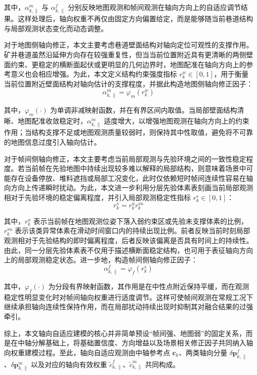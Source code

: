其中，$\alpha_{k,\parallel}^{m}$ 与 $\alpha_{k,\parallel}^{f}$ 分别反映地图观测和帧间观测在轴向方向上的自适应调节结果。这样处理后，轴向权重不再仅由固定方向偏置给定，而是能够随当前巷道结构与局部观测状态变化而动态调整。

对于地图侧轴向修正，本文主要考虑巷道壁面结构对轴向定位可观性的支撑作用。矿井巷道虽然沿延伸方向存在较强重复性，但当当前位置附近具有更清晰的两侧壁面约束、更稳定的横断面起伏或更明显的几何边界时，地图配准在轴向方向上的参考意义也会相应增强。为此，本文定义结构约束强度指标 $r_{k}^{w}\in[0,1]$，用于衡量当前位置附近壁面结构对轴向估计的支撑程度，并据此构造地图侧轴向修正因子：
\begin{equation}
\alpha_{k,\parallel}^{m}
=
\varphi_{m}\!\left(r_{k}^{w}\right)
\end{equation}

其中，$\varphi_{m}(\cdot)$ 为单调非减映射函数，并在有界区间内取值。当局部壁面结构清晰、地图配准收敛稳定时，$\alpha_{k,\parallel}^{m}$ 适度增大，以增强地图观测在轴向方向上的约束作用；当结构支撑不足或地图观测质量较弱时，则保持其中性取值，避免将不可靠的地图信息过度引入轴向估计。

对于帧间侧轴向修正，本文主要考虑当前局部观测与先验环境之间的一致性稳定程度。若当前帧在先验地图中持续出现较多难以解释的局部结构，则意味着场景中可能存在设备停放、堆料遮挡或局部工况变化，此时仅依赖短时帧间连续性容易在轴向方向上传递瞬时扰动。为此，本文进一步利用分层先验体素表刻画当前局部观测相对于先验环境的稳定偏离程度，并引入局部观测稳定性指标 $r_{k}^{s}\in[0,1]$：
\begin{equation}
r_{k}^{s}
=
r_{k}^{u}r_{k}^{su}
\end{equation}

其中，$r_{k}^{u}$ 表示当前帧在地图观测位姿下落入弱约束区或先验未支撑体素的比例，$r_{k}^{su}$ 表示该类异常体素在滑动时间窗口内的持续出现比例。前者反映当前时刻局部观测相对于先验结构的即时偏离程度，后者反映该偏离是否具有时间上的持续性。由此，同一分层先验体素表不仅用于描述横断面稳定结构，也可用于表征轴向方向上的局部观测稳定状态。进一步地，构造帧间侧轴向修正因子：
\begin{equation}
\alpha_{k,\parallel}^{f}
=
\varphi_{f}\!\left(r_{k}^{s}\right)
\end{equation}

其中，$\varphi_{f}(\cdot)$ 为分段有界映射函数，其作用是在中性点附近保持平缓，而在观测稳定性明显变化时对帧间轴向权重进行适度调节。这样可使帧间观测在常规工况下继续承担轴向连续性保持作用，而在局部扰动持续出现时抑制其对融合结果的过强牵引。

综上，本文轴向自适应建模的核心并非简单预设“帧间强、地图弱”的固定关系，而是在中轴分解基础上，将基础置信度、方向增益以及场景相关修正因子共同纳入轴向权重建模过程。至此，轴向自适应观测由中轴参考点 $\mathbf{c}_{k}$、两类轴向分量 $\delta \mathbf{p}_{k,\parallel}^{f}$、$\delta \mathbf{p}_{k,\parallel}^{m}$ 以及对应的轴向有效权重 $\tilde{c}_{k,\parallel}^{f}$、$\tilde{c}_{k,\parallel}^{m}$ 共同构成。

